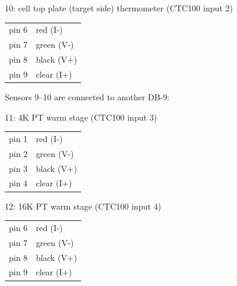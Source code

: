 10: cell top plate (target side) thermometer (CTC100 input 2)

\begin{tabular}{rl}
    pin 6 & red (I-)\\
    pin 7 & green (V-)\\
    pin 8 & black (V+)\\
    pin 9 & clear (I+)\\
\end{tabular}

Sensors 9--10 are connected to another DB-9:

11: 4K PT warm stage (CTC100 input 3)

\begin{tabular}{rl}
    pin 1 & red (I-)\\
    pin 2 & green (V-)\\
    pin 3 & black (V+)\\
    pin 4 & clear (I+)\\
\end{tabular}

12: 16K PT warm stage (CTC100 input 4)

\begin{tabular}{rl}
    pin 6 & red (I-)\\
    pin 7 & green (V-)\\
    pin 8 & black (V+)\\
    pin 9 & clear (I+)\\
\end{tabular}
